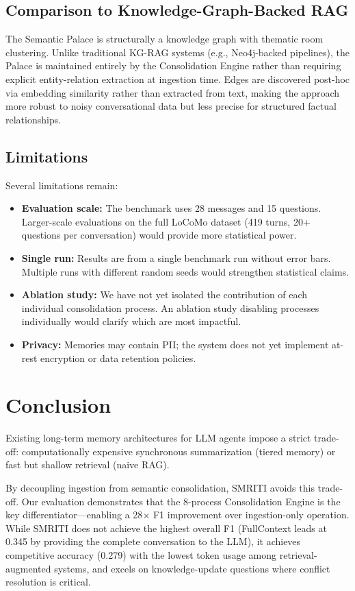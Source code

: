 \documentclass[conference]{IEEEtran}
\begin{document}
\subsection{Comparison to Knowledge-Graph-Backed RAG}
The Semantic Palace is structurally a knowledge graph with thematic room clustering. Unlike traditional KG-RAG systems (e.g., Neo4j-backed pipelines), the Palace is maintained entirely by the Consolidation Engine rather than requiring explicit entity-relation extraction at ingestion time. Edges are discovered post-hoc via embedding similarity rather than extracted from text, making the approach more robust to noisy conversational data but less precise for structured factual relationships.

\subsection{Limitations}
Several limitations remain:
\begin{itemize}
    \item \textbf{Evaluation scale:} The benchmark uses 28 messages and 15 questions. Larger-scale evaluations on the full LoCoMo dataset (419 turns, 20+ questions per conversation) would provide more statistical power.
    \item \textbf{Single run:} Results are from a single benchmark run without error bars. Multiple runs with different random seeds would strengthen statistical claims.
    \item \textbf{Ablation study:} We have not yet isolated the contribution of each individual consolidation process. An ablation study disabling processes individually would clarify which are most impactful.
    \item \textbf{Privacy:} Memories may contain PII; the system does not yet implement at-rest encryption or data retention policies.
\end{itemize}

\section{Conclusion}

Existing long-term memory architectures for LLM agents impose a strict trade-off: computationally expensive synchronous summarization (tiered memory) or fast but shallow retrieval (naive RAG).

By decoupling ingestion from semantic consolidation, SMRITI avoids this trade-off. Our evaluation demonstrates that the 8-process Consolidation Engine is the key differentiator---enabling a 28$\times$ F1 improvement over ingestion-only operation. While SMRITI does not achieve the highest overall F1 (FullContext leads at 0.345 by providing the complete conversation to the LLM), it achieves competitive accuracy (0.279) with the lowest token usage among retrieval-augmented systems, and excels on knowledge-update questions where conflict resolution is critical.
\end{document}

